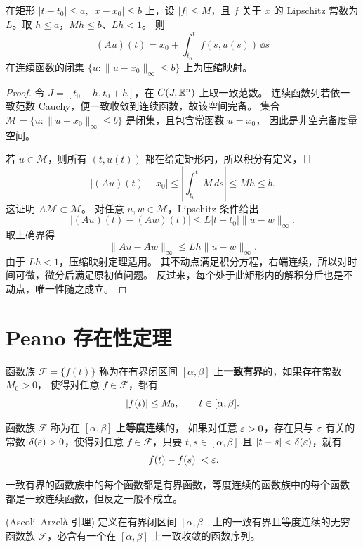 \begin{proposition}[Picard 算子]
在矩形 $|t-t_0|\leq a,\ |x-x_0|\leq b$ 上，设 $|f|\leq M$，且 $f$ 关于 $x$
的 Lipschitz 常数为 $L$。取 $h\leq a$，$Mh\leq b$、$Lh<1$。
则
\[
 (Au)(t)=x_0+\int_{t_0}^tf(s,u(s))\,\dd s
\]
在连续函数的闭集 $\{u:\|u-x_0\|_\infty\leq b\}$ 上为压缩映射。
\end{proposition}
\begin{proof}
令 $J=[t_0-h,t_0+h]$，在 $C(J,\mathbb{R}^n)$ 上取一致范数。
连续函数列若依一致范数 Cauchy，便一致收敛到连续函数，故该空间完备。
集合 $\mathcal M=\{u:\|u-x_0\|_\infty\leq b\}$ 是闭集，且包含常函数 $u=x_0$，
因此是非空完备度量空间。

若 $u\in\mathcal M$，则所有 $(t,u(t))$ 都在给定矩形内，所以积分有定义，且
\[
 |(Au)(t)-x_0|\leq\left|\int_{t_0}^t M\,ds\right|
 \leq Mh\leq b.
\]
这证明 $A\mathcal M\subset\mathcal M$。
对任意 $u,w\in\mathcal M$，Lipschitz 条件给出
\[
 |(Au)(t)-(Aw)(t)|\leq L|t-t_0|\|u-w\|_\infty.
\]
取上确界得 
\[
 \|Au-Aw\|_\infty\leq Lh\|u-w\|_\infty.
\]
由于 $Lh<1$，压缩映射定理适用。
其不动点满足积分方程，右端连续，所以对时间可微，微分后满足原初值问题。
反过来，每个处于此矩形内的解积分后也是不动点，唯一性随之成立。
\end{proof}

\section{Peano 存在性定理}\label{sec:Peano存在性定理}

\begin{definition}\label{def:一致有界与等度连续}
	函数族 $\mathcal{F}=\{f(t)\}$ 称为在有界闭区间
	$[\alpha,\beta]$ 上\textbf{一致有界}的，如果存在常数 $M_0>0$，
	使得对任意 $f\in\mathcal{F}$，都有
	\[
		\left| f(t) \right|\leq M_0,
		\qquad t\in[\alpha,\beta].
	\]

	函数族 $\mathcal{F}$ 称为在 $[\alpha,\beta]$ 上\textbf{等度连续}的，
	如果对任意 $\varepsilon>0$，存在只与 $\varepsilon$ 有关的常数
	$\delta(\varepsilon)>0$，使得对任意 $f\in\mathcal{F}$，只要
	$t,s\in[\alpha,\beta]$ 且 $\left| t-s \right|<\delta(\varepsilon)$，就有
	\[
		\left| f(t)-f(s) \right|<\varepsilon.
	\]
\end{definition}

一致有界的函数族中的每个函数都是有界函数，等度连续的函数族中的每个函数
都是一致连续函数，但反之一般不成立。

\begin{lemma}(Ascoli--Arzelà 引理)\label{lem:AscoliArzela引理}
	定义在有界闭区间 $[\alpha,\beta]$ 上的一致有界且等度连续的无穷函数族
	$\mathcal{F}$，必含有一个在 $[\alpha,\beta]$ 上一致收敛的函数序列。
\end{lemma}


